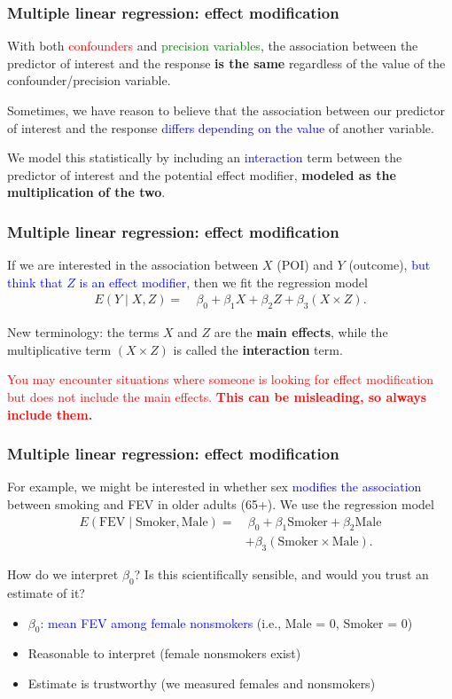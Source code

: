 \documentclass[12pt, 
hyperref={colorlinks=true, linkcolor=blue, urlcolor=cyan},dvipsnames]{beamer}
\begin{document}
\begin{frame}
\frametitle{Multiple linear regression: effect modification}

With both \textcolor{red}{confounders} and \textcolor{green}{precision variables}, the association between the predictor of interest and the response \textbf{is the same} regardless of the value of the confounder/precision variable.

Sometimes, we have reason to believe that the association between our predictor of interest and the response \textcolor{blue}{differs depending on the value} of another variable.

We model this statistically by including an \textcolor{blue}{interaction} term between the predictor of interest and the potential effect modifier, \textbf{modeled as the multiplication of the two}.
\end{frame}

\begin{frame}
\frametitle{Multiple linear regression: effect modification}

If we are interested in the association between $X$ (POI) and $Y$ (outcome), \textcolor{blue}{but think that $Z$ is an effect modifier}, then we fit the regression model
\begin{align*}
E(Y \mid X, Z) = & \ \beta_0 + \beta_1 X + \beta_2 Z + \beta_3 (X \times Z).
\end{align*}

New terminology: the terms $X$ and $Z$ are the \textbf{main effects}, while the multiplicative term $(X \times Z)$ is called the \textbf{interaction} term.

\textcolor{red}{You may encounter situations where someone is looking for effect modification but does not include the main effects. \textbf{This can be misleading, so always include them.}}
\end{frame}

\begin{frame}
\frametitle{Multiple linear regression: effect modification}
For example, we might be interested in whether sex \textcolor{blue}{modifies the association} between smoking and FEV in older adults (65+). We use the regression model
\begin{align*}
E(\text{FEV} \mid \text{Smoker}, \text{Male}) = & \ \beta_0 + \beta_1 \text{Smoker} + \beta_2 \text{Male}\\
& + \beta_3 (\text{Smoker} \times \text{Male}).
\end{align*}

How do we interpret $\beta_0$? Is this scientifically sensible, and would you trust an estimate of it?\vspace{-0.2cm} \pause
\begin{itemize}
\item $\beta_0$: \textcolor{blue}{mean FEV among female nonsmokers} (i.e., Male = 0, Smoker = 0)
\item Reasonable to interpret (female nonsmokers exist)
\item Estimate is trustworthy (we measured females and nonsmokers)
\end{itemize}
\end{frame}
\end{document}
